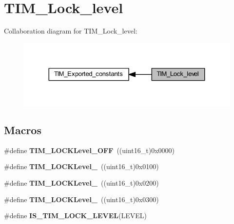 \hypertarget{group___t_i_m___lock__level}{}\section{T\+I\+M\+\_\+\+Lock\+\_\+level}
\label{group___t_i_m___lock__level}
Collaboration diagram for T\+I\+M\+\_\+\+Lock\+\_\+level\+:\nopagebreak
\begin{figure}[H]
\begin{center}
\leavevmode
\includegraphics[width=324pt]{group___t_i_m___lock__level}
\end{center}
\end{figure}
\subsection*{Macros}
\begin{DoxyCompactItemize}
\item 
\mbox{\label{group___t_i_m___lock__level_ga84d318c62d3e5dfe7082610d03e11f2f}} 
\#define {\bfseries T\+I\+M\+\_\+\+L\+O\+C\+K\+Level\+\_\+\+O\+FF}~((uint16\+\_\+t)0x0000)
\item 
\mbox{\label{group___t_i_m___lock__level_ga7e4326fc7756ebf5e9eb9776c2734aea}} 
\#define {\bfseries T\+I\+M\+\_\+\+L\+O\+C\+K\+Level\+\_}~((uint16\+\_\+t)0x0100)
\item 
\mbox{\label{group___t_i_m___lock__level_ga91bdf218f766e6a10b7a7df407250d25}} 
\#define {\bfseries T\+I\+M\+\_\+\+L\+O\+C\+K\+Level\+\_}~((uint16\+\_\+t)0x0200)
\item 
\mbox{\label{group___t_i_m___lock__level_gaa0a0c1ffd9dc582d6571780c1747920b}} 
\#define {\bfseries T\+I\+M\+\_\+\+L\+O\+C\+K\+Level\+\_}~((uint16\+\_\+t)0x0300)
\item 
\#define {\bfseries I\+S\+\_\+\+T\+I\+M\+\_\+\+L\+O\+C\+K\+\_\+\+L\+E\+V\+EL}(L\+E\+V\+EL)
\end{DoxyCompactItemize}


